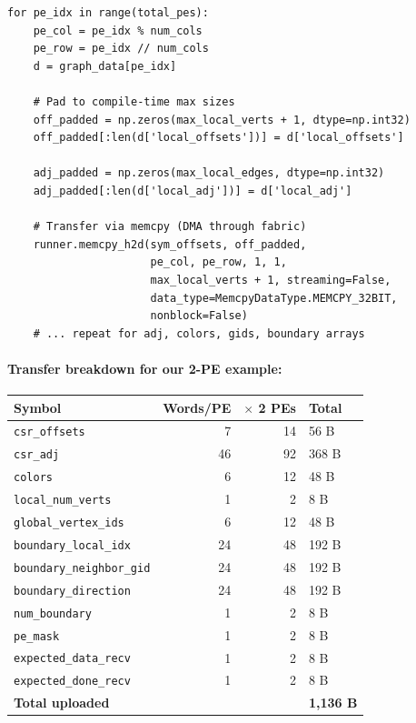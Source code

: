 \documentclass[11pt,letterpaper]{article}
\begin{document}
\begin{lstlisting}[language=PyHost, caption={Uploading to one PE (from \texttt{cerebras\_host.py})}, label=lst:h2d]
for pe_idx in range(total_pes):
    pe_col = pe_idx % num_cols
    pe_row = pe_idx // num_cols
    d = graph_data[pe_idx]

    # Pad to compile-time max sizes
    off_padded = np.zeros(max_local_verts + 1, dtype=np.int32)
    off_padded[:len(d['local_offsets'])] = d['local_offsets']

    adj_padded = np.zeros(max_local_edges, dtype=np.int32)
    adj_padded[:len(d['local_adj'])] = d['local_adj']

    # Transfer via memcpy (DMA through fabric)
    runner.memcpy_h2d(sym_offsets, off_padded,
                      pe_col, pe_row, 1, 1,
                      max_local_verts + 1, streaming=False,
                      data_type=MemcpyDataType.MEMCPY_32BIT,
                      nonblock=False)
    # ... repeat for adj, colors, gids, boundary arrays
\end{lstlisting}

\paragraph{Transfer breakdown for our 2-PE example:}

\begin{center}
\renewcommand{\arraystretch}{1.2}
\begin{tabular}{lrrl}
\toprule
\textbf{Symbol} & \textbf{Words/PE} & \textbf{$\times$ 2 PEs} & \textbf{Total} \\
\midrule
\texttt{csr\_offsets}     & 7    & 14   & 56 B \\
\texttt{csr\_adj}         & 46   & 92   & 368 B \\
\texttt{colors}           & 6    & 12   & 48 B \\
\texttt{local\_num\_verts} & 1   & 2    & 8 B \\
\texttt{global\_vertex\_ids} & 6 & 12   & 48 B \\
\texttt{boundary\_local\_idx} & 24 & 48 & 192 B \\
\texttt{boundary\_neighbor\_gid} & 24 & 48 & 192 B \\
\texttt{boundary\_direction} & 24 & 48 & 192 B \\
\texttt{num\_boundary}    & 1    & 2    & 8 B \\
\texttt{pe\_mask}         & 1    & 2    & 8 B \\
\texttt{expected\_data\_recv} & 1 & 2 & 8 B \\
\texttt{expected\_done\_recv} & 1 & 2 & 8 B \\
\midrule
\textbf{Total uploaded}   &      &      & \textbf{1,136 B} \\
\bottomrule
\end{tabular}
\end{center}
\end{document}
